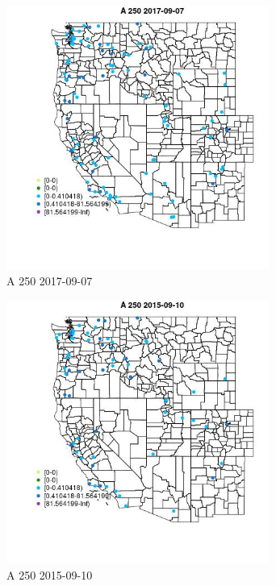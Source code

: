 \begin{figure} 
\centering  
\includegraphics[width=0.77\textwidth]{Code_Outputs/Report_ML_input_PM25_Step4_part_e_de_duplicated_aveswNAs_MapObsA_2502017-09-07.jpg} 
\caption{\label{fig:Report_ML_input_PM25_Step4_part_e_de_duplicated_aveswNAsMapObsA_2502017-09-07}A 250 2017-09-07} 
\end{figure} 
 

\begin{figure} 
\centering  
\includegraphics[width=0.77\textwidth]{Code_Outputs/Report_ML_input_PM25_Step4_part_e_de_duplicated_aveswNAs_MapObsA_2502015-09-10.jpg} 
\caption{\label{fig:Report_ML_input_PM25_Step4_part_e_de_duplicated_aveswNAsMapObsA_2502015-09-10}A 250 2015-09-10} 
\end{figure} 
 

